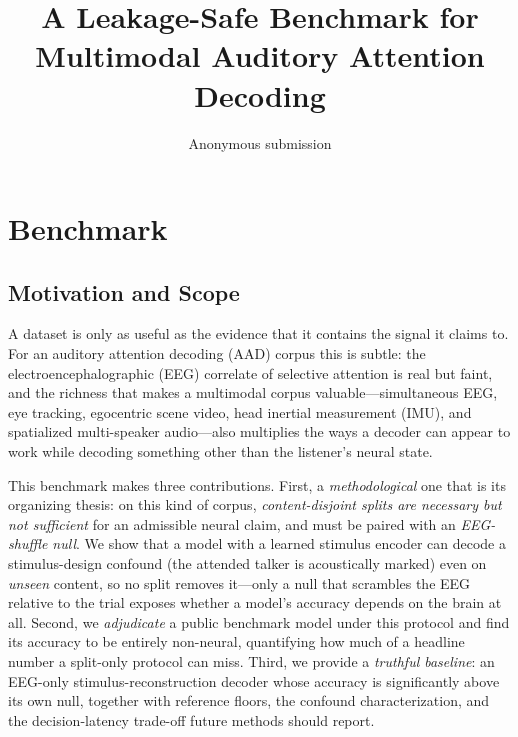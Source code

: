 \documentclass[journal]{IEEEtran}
\begin{document}
\title{A Leakage-Safe Benchmark for Multimodal Auditory Attention Decoding}

\author{Anonymous submission}

\maketitle

\section{Benchmark}
\label{sec:benchmark}

\subsection{Motivation and Scope}
\label{sec:bench-motivation}

A dataset is only as useful as the evidence that it contains the signal it
claims to. For an auditory attention decoding (AAD) corpus this is subtle: the
electroencephalographic (EEG) correlate of selective attention is real but faint,
and the richness that makes a multimodal corpus valuable---simultaneous EEG, eye
tracking, egocentric scene video, head inertial measurement (IMU), and spatialized
multi-speaker audio---also multiplies the ways a decoder can appear to work while
decoding something other than the listener's neural state.

This benchmark makes three contributions. First, a \emph{methodological} one that
is its organizing thesis: on this kind of corpus, \emph{content-disjoint splits are
necessary but not sufficient} for an admissible neural claim, and must be paired
with an \emph{EEG-shuffle null}. We show that a model with a learned stimulus
encoder can decode a stimulus-design confound (the attended talker is acoustically
marked) even on \emph{unseen} content, so no split removes it---only a null that
scrambles the EEG relative to the trial exposes whether a model's accuracy depends
on the brain at all. Second, we \emph{adjudicate} a public benchmark model under
this protocol and find its accuracy to be entirely non-neural, quantifying how much
of a headline number a split-only protocol can miss. Third, we provide a
\emph{truthful baseline}: an EEG-only stimulus-reconstruction decoder whose accuracy
is significantly above its own null, together with reference floors, the confound
characterization, and the decision-latency trade-off future methods should report.
\end{document}
